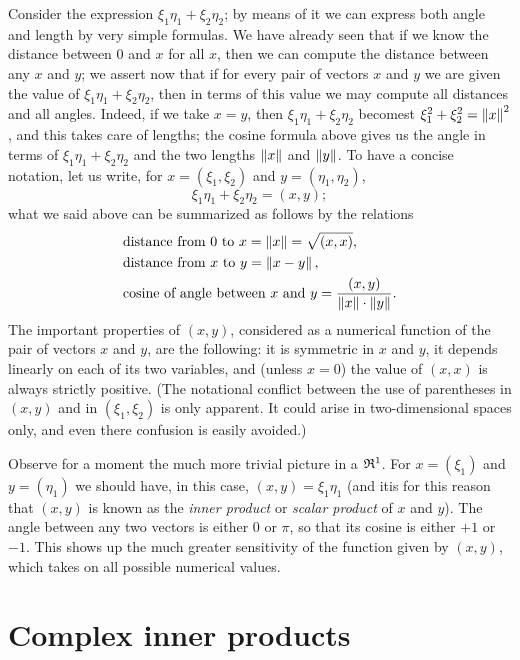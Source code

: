 Consider the expression \(\xi_1\eta_1 + \xi_2\eta_2\); by means of it we can
express both angle and length by very simple formulas. We have already seen that
if we know the distance between \(0\) and \(x\) for all \(x\), then we can
compute the distance between any \(x\) and \(y\); we assert now that if for
every pair of vectors \(x\) and \(y\) we are given the value of \(\xi_1\eta_1 +
\xi_2\eta_2\), then in terms of this value we may compute all distances and all
angles. Indeed, if we take \(x = y\), then \(\xi_1\eta_1 + \xi_2\eta_2\)
becomest \(\xi_1^2 + \xi_2^2 = \left\lVert x\right\rVert^2\), and this takes care of lengths; the
cosine formula above gives us the angle in terms of \(\xi_1\eta_1 +
\xi_2\eta_2\) and the two lengths \(\left\lVert x\right\rVert\) and \(\left\lVert y\right\rVert\). To have a
concise notation, let us write, for \(x = (\xi_1, \xi_2)\) and \(y = (\eta_1,
\eta_2)\),
\begin{equation*}
    \xi_1\eta_1 + \xi_2\eta_2 = (x, y);
\end{equation*}
what we said above can be summarized as follows by the relations
\begin{align*}
    &\text{distance from } 0 \text{ to } x = \left\lVert x\right\rVert = \sqrt{(x, x)}, \\
    &\text{distance from } x \text{ to } y = \left\lVert x-y\right\rVert, \\
    &\text{cosine of angle between } x \text{ and } y = \frac{(x, y)}{\left\lVert x\right\rVert\cdot\left\lVert y\right\rVert}.
\end{align*}
The important properties of \((x,y)\), considered as a numerical function of the
pair of vectors \(x\) and \(y\), are the following: it is symmetric in \(x\) and
\(y\), it depends linearly on each of its two variables, and (unless \(x = 0\))
the value of \((x, x)\) is always strictly positive. (The notational conflict
between the use of parentheses in \((x, y)\) and in \((\xi_1, \xi_2)\) is only
apparent. It could arise in two-dimensional spaces only, and even there
confusion is easily avoided.)

Observe for a moment the much more trivial picture in a \(\frak{R}^1\). For \(x =
(\xi_1)\) and \(y= (\eta_1)\) we should have, in this case, \((x, y) =
\xi_1\eta_1\) (and itis for this reason that \((x,y)\) is known as the
\emph{inner product} or \emph{scalar product} of \(x\) and \(y\)). The angle
between any two vectors is either \(0\) or \(\pi\), so that its cosine is either
\(+1\) or \(-1\). This shows up the much greater sensitivity of the function
given by \((x,y)\), which takes on all possible numerical values.

\section{Complex inner products}

